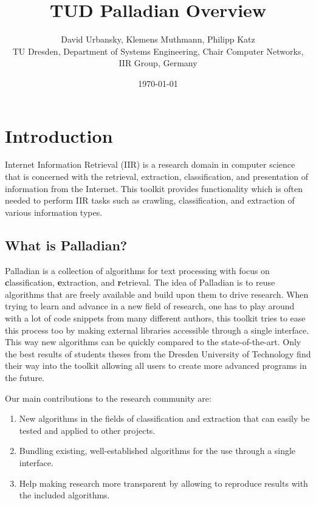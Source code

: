 \documentclass[a4paper,twoside]{book}      %
\date{\today}
\title{TUD Palladian Overview}
\author{David Urbansky, Klemens Muthmann, Philipp Katz \\
{\small TU Dresden, Department of Systems Engineering, Chair Computer Networks, IIR Group, Germany}
}
\begin{document}
\maketitle

\tableofcontents

\chapter{Introduction}
Internet Information Retrieval (IIR) is a research domain in computer science that is concerned with the retrieval, extraction, classification, and presentation of information from the Internet. This toolkit provides functionality which is often needed to perform IIR tasks such as crawling, classification, and extraction of various information types.

\section{What is Palladian?}
Palladian is a collection of algorithms for text processing with focus on {\textbf classification}, {\textbf extraction}, and {\textbf retrieval}. The idea of Palladian is to reuse algorithms that are freely available and build upon them to drive research. When trying to learn and advance in a new field of research, one has to play around with a lot of code snippets from many different authors, this toolkit tries to ease this process too by making external libraries accessible through a single interface. This way new algorithms can be quickly compared to the state-of-the-art.
Only the best results of students theses from the Dresden University of Technology find their way into the toolkit allowing all users to create more advanced programs in the future.

Our main contributions to the research community are:
\begin{enumerate}
\item New algorithms in the fields of classification and extraction that can easily be tested and applied to other projects.
\item Bundling existing, well-established algorithms for the use through a single interface.
\item Help making research more transparent by allowing to reproduce results with the included algorithms.
\end{enumerate}
\end{document}
